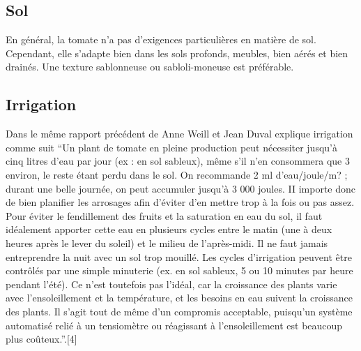 \subsection{Sol}
En général, la tomate n'a pas d'exigences particulières en matière de sol. Cependant, elle s'adapte bien dans les sols profonds, meubles, bien aérés et bien drainés. Une texture sablonneuse ou sabloli-moneuse est préférable.
\subsection{Irrigation}
Dans le même rapport précédent de Anne Weill et Jean Duval explique irrigation comme suit 
“Un plant de tomate en pleine production peut nécessiter jusqu'à cinq litres d'eau par jour (ex : en sol sableux), même s'il n'en consommera que 3 environ, le reste étant perdu dans le sol. On recommande 2 ml d'eau/joule/m? ; durant une belle journée, on peut accumuler jusqu'à 3 000 joules. II importe donc de bien planifier les arrosages afin d'éviter d'en mettre trop à la fois ou pas assez.
Pour éviter le fendillement des fruits et la saturation en eau du sol, il faut idéalement apporter cette eau en plusieurs cycles entre le matin (une à deux heures après le lever du soleil) et le milieu de l'après-midi. Il ne faut jamais entreprendre la nuit avec un sol trop mouillé. Les cycles d'irrigation peuvent être contrôlés par une simple minuterie (ex. en sol sableux, 5 ou 10 minutes par heure pendant l'été). Ce n'est toutefois pas l'idéal, car la croissance des plants varie avec l'ensoleillement et la température, et les besoins en eau suivent la croissance des plants. Il s'agit tout de même d'un compromis acceptable, puisqu'un système automatisé relié à un tensiomètre ou réagissant à l'ensoleillement est beaucoup plus coûteux.”.[4]